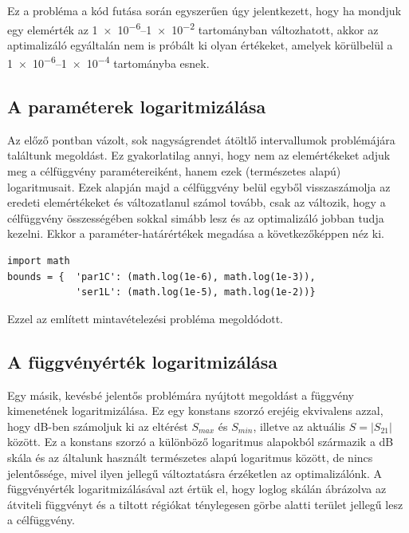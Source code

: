         Ez a probléma a kód futása során egyszerűen úgy jelentkezett, hogy ha mondjuk egy elemérték az \numrange{1e-6}{1e-2} tartományban változhatott, akkor az aptimalizáló egyáltalán nem is próbált ki olyan értékeket, amelyek körülbelül a \numrange{1e-6}{1e-4} tartományba esnek.
	\subsection{A paraméterek logaritmizálása}
        Az előző pontban vázolt, sok nagyságrendet átöltlő intervallumok problémájára találtunk megoldást. Ez gyakorlatilag annyi, hogy nem az elemértékeket adjuk meg a célfüggvény paramétereiként, hanem ezek (természetes alapú) logaritmusait. Ezek alapján majd a célfüggvény belül egyből visszaszámolja az eredeti elemértékeket és változatlanul számol tovább, csak az változik, hogy a célfüggvény összességében sokkal simább lesz és az optimalizáló jobban tudja kezelni. Ekkor a paraméter-határértékek megadása a következőképpen néz ki.
        \begin{lstlisting}
import math
bounds = {  'par1C': (math.log(1e-6), math.log(1e-3)),
            'ser1L': (math.log(1e-5), math.log(1e-2))}
		\end{lstlisting}
        Ezzel az említett mintavételezési probléma megoldódott.
	\subsection{A függvényérték logaritmizálása}
        Egy másik, kevésbé jelentős problémára nyújtott megoldást a függvény kimenetének logaritmizálása. Ez egy konstans szorzó erejéig ekvivalens azzal, hogy dB-ben számoljuk ki az eltérést $S_{max}$ és $S_{min}$, illetve az aktuális $S=|S_{21}|$ között. Ez a konstans szorzó a különböző logaritmus alapokból származik a dB skála és az általunk használt természetes alapú logaritmus között, de nincs jelentőssége, mivel ilyen jellegű változtatásra érzéketlen az optimalizálónk. A függvényérték logaritmizálásával azt értük el, hogy loglog skálán ábrázolva az átviteli függvényt és a tiltott régiókat ténylegesen görbe alatti terület jellegű lesz a célfüggvény.
